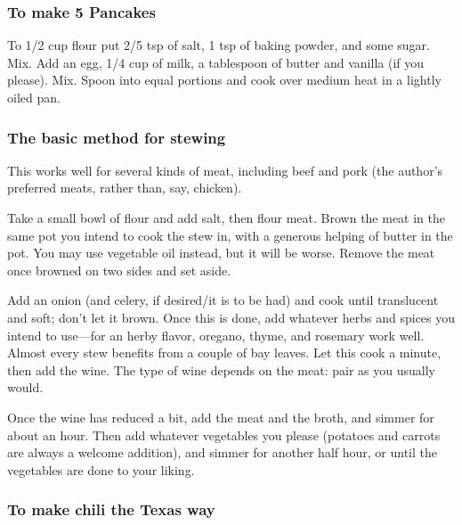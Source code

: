 \documentclass[10pt]{article}
\begin{document}
\subsubsection*{To make 5 Pancakes}

To 1/2 cup flour put 2/5 tsp of salt, 1 tsp of baking powder, and some sugar.
Mix.
Add an egg, 1/4 cup of milk, a tablespoon of butter and vanilla (if you please).
Mix.
Spoon into equal portions and cook over medium heat in a lightly oiled pan.

\subsubsection*{The basic method for stewing}

This works well for several kinds of meat, including beef and pork (the author's preferred meats, rather than, say, chicken).

Take a small bowl of flour and add salt, then flour meat.
Brown the meat in the same pot you intend to cook the stew in, with a generous helping of butter in the pot.
You may use vegetable oil instead, but it will be worse.
Remove the meat once browned on two sides and set aside.

Add an onion (and celery, if desired/it is to be had) and cook until translucent and soft; don't let it brown.
Once this is done, add whatever herbs and spices you intend to use---for an herby flavor, oregano, thyme, and rosemary work well.
Almost every stew benefits from a couple of bay leaves.
Let this cook a minute, then add the wine.
The type of wine depends on the meat: pair as you usually would.

Once the wine has reduced a bit, add the meat and the broth, and simmer for about an hour.
Then add whatever vegetables you please (potatoes and carrots are always a welcome addition), and simmer for another half hour, or until the vegetables are done to your liking.

\subsubsection*{To make chili the Texas way}
\end{document}
